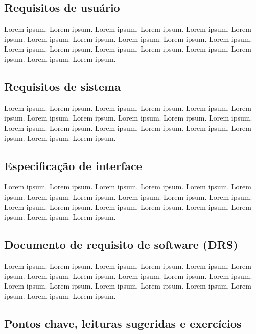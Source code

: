 \documentclass[
]{book}
\begin{document}
\hypertarget{requisitos-de-usuuxe1rio}{%
\subsection{Requisitos de usuário}\label{requisitos-de-usuuxe1rio}}

Lorem ipsum. Lorem ipsum. Lorem ipsum. Lorem ipsum. Lorem ipsum. Lorem ipsum. Lorem ipsum. Lorem ipsum. Lorem ipsum. Lorem ipsum. Lorem ipsum. Lorem ipsum. Lorem ipsum. Lorem ipsum. Lorem ipsum. Lorem ipsum. Lorem ipsum. Lorem ipsum. Lorem ipsum.

\hypertarget{requisitos-de-sistema}{%
\subsection{Requisitos de sistema}\label{requisitos-de-sistema}}

Lorem ipsum. Lorem ipsum. Lorem ipsum. Lorem ipsum. Lorem ipsum. Lorem ipsum. Lorem ipsum. Lorem ipsum. Lorem ipsum. Lorem ipsum. Lorem ipsum. Lorem ipsum. Lorem ipsum. Lorem ipsum. Lorem ipsum. Lorem ipsum. Lorem ipsum. Lorem ipsum. Lorem ipsum.

\hypertarget{especificauxe7uxe3o-de-interface}{%
\subsection{Especificação de interface}\label{especificauxe7uxe3o-de-interface}}

Lorem ipsum. Lorem ipsum. Lorem ipsum. Lorem ipsum. Lorem ipsum. Lorem ipsum. Lorem ipsum. Lorem ipsum. Lorem ipsum. Lorem ipsum. Lorem ipsum. Lorem ipsum. Lorem ipsum. Lorem ipsum. Lorem ipsum. Lorem ipsum. Lorem ipsum. Lorem ipsum. Lorem ipsum.

\hypertarget{documento-de-requisito-de-software-drs}{%
\subsection{Documento de requisito de software (DRS)}\label{documento-de-requisito-de-software-drs}}

Lorem ipsum. Lorem ipsum. Lorem ipsum. Lorem ipsum. Lorem ipsum. Lorem ipsum. Lorem ipsum. Lorem ipsum. Lorem ipsum. Lorem ipsum. Lorem ipsum. Lorem ipsum. Lorem ipsum. Lorem ipsum. Lorem ipsum. Lorem ipsum. Lorem ipsum. Lorem ipsum. Lorem ipsum.

\hypertarget{pontos-chave-leituras-sugeridas-e-exercuxedcios}{%
\subsection*{Pontos chave, leituras sugeridas e exercícios}\label{pontos-chave-leituras-sugeridas-e-exercuxedcios}}
\end{document}
